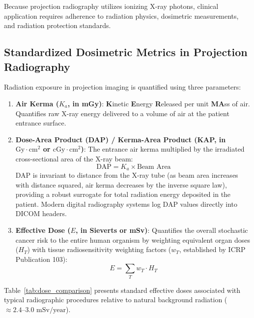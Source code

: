 \documentclass[11pt,a4paper]{article}
\begin{document}
Because projection radiography utilizes ionizing X-ray photons, clinical application requires adherence to radiation physics, dosimetric measurements, and radiation protection standards.

\subsection{Standardized Dosimetric Metrics in Projection Radiography}
Radiation exposure in projection imaging is quantified using three parameters:
\begin{enumerate}[leftmargin=*]
    \item \textbf{Air Kerma ($K_a$, in mGy)}: \textbf{K}inetic \textbf{E}nergy \textbf{R}eleased per unit \textbf{MA}ss of air. Quantifies raw X-ray energy delivered to a volume of air at the patient entrance surface.
    \item \textbf{Dose-Area Product (DAP) / Kerma-Area Product (KAP, in $\text{Gy}\cdot\text{cm}^2$ or $\text{cGy}\cdot\text{cm}^2$)}: The entrance air kerma multiplied by the irradiated cross-sectional area of the X-ray beam:
    \begin{equation}
        \text{DAP} = K_a \times \text{Beam Area}
    \end{equation}
    DAP is invariant to distance from the X-ray tube (as beam area increases with distance squared, air kerma decreases by the inverse square law), providing a robust surrogate for total radiation energy deposited in the patient. Modern digital radiography systems log DAP values directly into DICOM headers.
    \item \textbf{Effective Dose ($E$, in Sieverts or mSv)}: Quantifies the overall stochastic cancer risk to the entire human organism by weighting equivalent organ doses ($H_T$) with tissue radiosensitivity weighting factors ($w_T$, established by ICRP Publication 103):
    \begin{equation}
        E = \sum_T w_T \cdot H_T
    \end{equation}
\end{enumerate}

Table~\ref{tab:dose_comparison} presents standard effective doses associated with typical radiographic procedures relative to natural background radiation ($\approx 2.4\text{--}3.0\text{ mSv/year}$).
\end{document}
